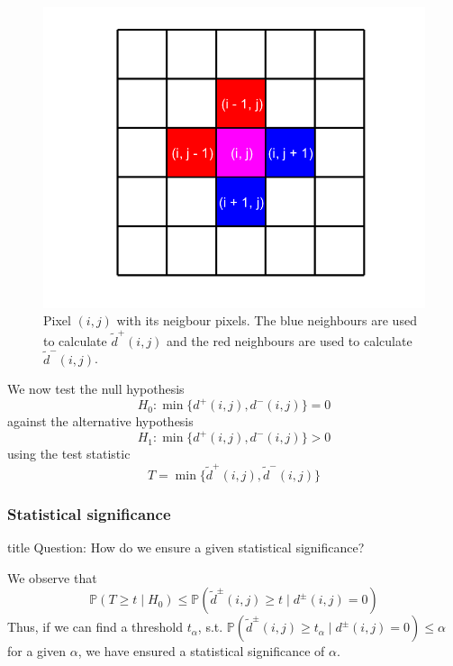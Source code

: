 \documentclass{beamer}
\begin{document}
\begin{frame}
	\begin{figure}
		\includegraphics[width=0.6\linewidth]{Testing/TestStatistic}
		\caption[Test Statistic]{Pixel $(i, j)$ with its neigbour pixels. The blue neighbours are used to calculate $\tilde{d}^+(i, j)$ and the red neighbours are used to calculate $\tilde{d}^-(i, j)$.}
		\label{fig:TestStatistic}
	\end{figure}
\end{frame}

\begin{frame}
	We now test the null hypothesis $$H_0 : \min\{ d^+(i, j), d^-(i, j) \} = 0$$ against the alternative hypothesis $$H_1 : \min\{ d^+(i, j), d^-(i, j) \} > 0$$ using the test statistic $$T = \min \{ \tilde{d}^+(i, j), \tilde{d}^-(i, j) \}$$
\end{frame}

\subsubsection{Statistical significance}

\begin{frame}
	\begin{beamercolorbox}[sep=8pt,center,shadow=true,rounded=true]{title}
		Question: How do we ensure a given statistical significance?
	\end{beamercolorbox}
\end{frame}

\begin{frame}
	We observe that
	\begin{equation*}
		\mathbb{P}(T \geq t \mid H_0) \leq \mathbb{P}(\tilde{d}^\pm(i, j) \geq t \mid d^\pm(i, j) = 0)
	\end{equation*}
	Thus, if we can find a threshold $t_\alpha$, s.t. $\mathbb{P}(\tilde{d}^\pm(i, j) \geq t_\alpha \mid d^\pm(i, j) = 0) \leq \alpha$ for a given $\alpha$, we have ensured a statistical significance of $\alpha$.
\end{frame}
\end{document}
